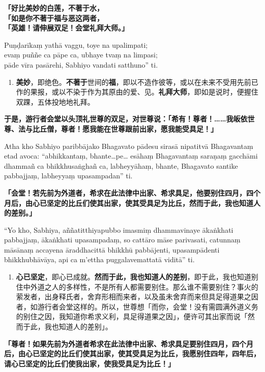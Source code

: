 \textbf{「好比美妙的白莲，不著于水，\\}
\textbf{「如是你不著于福与恶这两者，\\}
\textbf{「英雄！请伸展双足！会堂礼拜大师。」}

Puṇḍarīkaṃ yathā vaggu, toye na upalimpati;\\
evaṃ puññe ca pāpe ca, ubhaye tvaṃ na limpasi;\\
pāde vīra pasārehi, Sabhiyo vandati satthuno” ti. %

\begin{enumerate}\item \textbf{美妙}，即绝色。\textbf{不著于}世间的\textbf{福}，即以不造作彼等，或以在未来不受用先前已作的果报，或以不染于作为其原由的爱、见。\textbf{礼拜大师}，即如是说时，便握住双踝，五体投地地礼拜。\end{enumerate}

\textbf{于是，游行者会堂以头顶礼世尊的双足，对世尊说：「希有！尊者！……我皈依世尊、法与比丘僧，尊者！愿我能在世尊跟前出家，愿我能受具足！」}

Atha kho Sabhiyo paribbājako Bhagavato pādesu sirasā nipatitvā Bhagavantaṃ etad avoca: “abhikkantaṃ, bhante…pe… esāhaṃ Bhagavantaṃ saraṇaṃ gacchāmi dhammañ ca bhikkhusaṅghañ ca, labheyyāhaṃ, bhante, Bhagavato santike pabbajjaṃ, labheyyaṃ upasampadan” ti.

\textbf{「会堂！若先前为外道者，希求在此法律中出家、希求具足，他要别住四月，四个月后，由心已坚定的比丘们使其出家，使其受具足为比丘，然而于此，我也知道人的差别。」}

“Yo kho, Sabhiya, aññatitthiyapubbo imasmiṃ dhammavinaye ākaṅkhati pabbajjaṃ, ākaṅkhati upasampadaṃ, so cattāro māse parivasati, catunnaṃ māsānaṃ accayena āraddhacittā bhikkhū pabbājenti, upasampādenti bhikkhubhāvāya, api ca m’ettha puggalavemattatā viditā” ti.

\begin{enumerate}\item \textbf{心已坚定}，即心已成就。\textbf{然而于此，我也知道人的差别}，即于此，我也知道别住中外道之人的多样性，不是所有人都需要别住。那么谁不需要别住？事火的萦发者，出身释氏者，舍弃形相而来者，以及虽未舍弃而来但具足得道果之因者，如游行者会堂这样的。所以，世尊想「而你，会堂！没有需圆满外道义务的别住之因，我知道你希求义利，具足得道果之因」，便许可其出家而说「然而于此，我也知道人的差别」。\end{enumerate}

\textbf{「尊者！如果先前为外道者希求在此法律中出家、希求具足要别住四月，四个月后，由心已坚定的比丘们使其出家，使其受具足为比丘，我愿别住四年，四年后，请心已坚定的比丘们使我出家，使我受具足为比丘！」}

